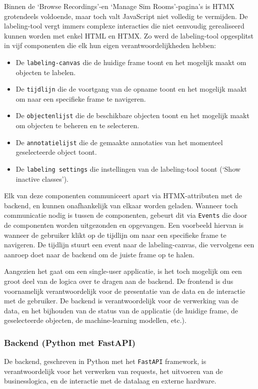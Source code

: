Binnen de `Browse Recordings'-en `Manage Sim Rooms'-pagina's is HTMX grotendeels voldoende, maar toch valt JavaScript niet volledig te vermijden.
De labeling-tool vergt immers complexe interacties die niet eenvoudig gerealiseerd kunnen worden met enkel HTML en HTMX.
Zo werd de labeling-tool opgesplitst in vijf componenten die elk hun eigen verantwoordelijkheden hebben:
\begin{itemize}
    \item De \texttt{labeling-canvas} die de huidige frame toont en het mogelijk maakt om objecten te labelen.
    \item De \texttt{tijdlijn} die de voortgang van de opname toont en het mogelijk maakt om naar een specifieke frame te navigeren.
    \item De \texttt{objectenlijst} die de beschikbare objecten toont en het mogelijk maakt om objecten te beheren en te selecteren.
    \item De \texttt{annotatielijst} die de gemaakte annotaties van het momenteel geselecteerde object toont.
    \item De \texttt{labeling settings} die instellingen van de labeling-tool toont (`Show inactive classes').
\end{itemize}
Elk van deze componenten communiceert apart via HTMX-attributen met de backend, en kunnen onafhankelijk van elkaar worden geladen.
Wanneer toch communicatie nodig is tussen de componenten, gebeurt dit via \texttt{Events} die door de componenten worden uitgezonden en opgevangen.
Een voorbeeld hiervan is wanneer de gebruiker klikt op de tijdlijn om naar een specifieke frame te navigeren.
De tijdlijn stuurt een event naar de labeling-canvas, die vervolgens een aanroep doet naar de backend om de juiste frame op te halen.

Aangezien het gaat om een single-user applicatie, is het toch mogelijk om een groot deel van de logica over te dragen aan de backend.
De frontend is dus voornamelijk verantwoordelijk voor de presentatie van de data en de interactie met de gebruiker.
De backend is verantwoordelijk voor de verwerking van de data, en het bijhouden van de status van de applicatie (de huidige frame, de geselecteerde objecten, de machine-learning modellen, etc.).

\subsubsection{Backend (Python met FastAPI)}

De backend, geschreven in Python met het \texttt{FastAPI} framework, is verantwoordelijk voor het verwerken van requests, 
het uitvoeren van de businesslogica, en de interactie met de datalaag en externe hardware.

